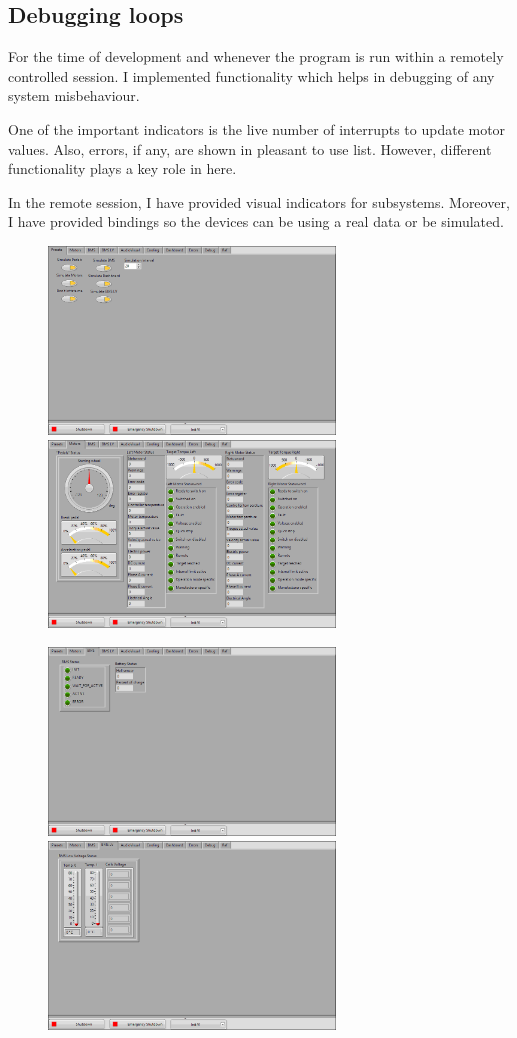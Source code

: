 \subsection{Debugging loops}
For the time of development and whenever the program is run within a remotely controlled session. I implemented functionality which helps in debugging of any system misbehaviour.

One of the important indicators is the live number of interrupts to update motor values. Also, errors, if any, are shown in pleasant to use list. However, different functionality plays a key role in here.

In the remote session, I have provided visual indicators for subsystems. Moreover, I have provided bindings so the devices can be using a real data or be simulated.

\begin{figure}[h]
    \centering
        \includegraphics[height=5cm]{figures/Run_mainp0.png}
        \includegraphics[height=5cm]{figures/Run_mainp1.png}
\end{figure}
\begin{figure}[h]\ContinuedFloat
    \centering
        \includegraphics[height=5cm]{figures/Run_mainp2.png}
        \includegraphics[height=5cm]{figures/Run_mainp3.png}
\end{figure}
